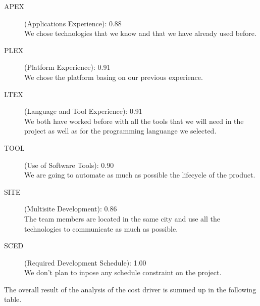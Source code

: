 \documentclass[11pt]{article} %
\begin{document}
\begin{description}
	\item[APEX] (Applications Experience): {\large 0.88} \\  We chose technologies that we know and that we have already used before.
	\item[PLEX] (Platform Experience): {\large 0.91} \\  We chose the platform basing on our previous experience.
	\item[LTEX] (Language and Tool Experience): {\large 0.91} \\  We both have worked before with all the tools that we will need in the project as well as for the programming languange we selected.
	\item[TOOL] (Use of Software Tools): {\large 0.90} \\  We are going to automate as much as possible the lifecycle of the product.
	\item[SITE] (Multisite Development): {\large 0.86} \\  The team members are located in the same city and use all the technologies to communicate as much as possible.
	\item[SCED] (Required Development Schedule): {\large 1.00} \\ We don't plan to inpose any schedule constraint on the project.
\end{description}

The overall result of the analysis of the cost driver is summed up in the following table.
\end{document}
